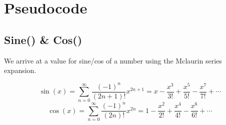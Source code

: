 \section{Pseudocode}
  \subsection{Sine() \& Cos()}
    \begin{flushleft}
    We arrive at a value for sine/cos of a number using the Mclaurin series expansion.
    \end{flushleft}
    $$\sin(x) = \sum_{n=0}^{\infty} \frac{(-1)^n}{(2n+1)!} x^{2n+1} = x - \frac{x^3}{3!} + \frac{x^5}{5!} - \frac{x^7}{7!} + \cdots$$
    $$\cos(x) = \sum_{n=0}^{\infty} \frac{(-1)^n}{(2n)!} x^{2n} = 1 - \frac{x^2}{2!} + \frac{x^4}{4!} - \frac{x^6}{6!} + \cdots$$


